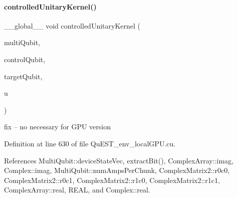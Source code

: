 \paragraph{\texorpdfstring{controlled\+Unitary\+Kernel()}{controlledUnitaryKernel()}}
{\footnotesize\ttfamily \+\_\+\+\_\+global\+\_\+\+\_\+ void controlled\+Unitary\+Kernel (\begin{DoxyParamCaption}\item[{\mbox{\hyperlink{structMultiQubit}{Multi\+Qubit}}}]{multi\+Qubit,  }\item[{const int}]{control\+Qubit,  }\item[{const int}]{target\+Qubit,  }\item[{\mbox{\hyperlink{structComplexMatrix2}{Complex\+Matrix2}}}]{u }\end{DoxyParamCaption})}

fix -- no necessary for G\+PU version 

Definition at line 630 of file Qu\+E\+S\+T\+\_\+env\+\_\+local\+G\+P\+U.\+cu.



References Multi\+Qubit\+::device\+State\+Vec, extract\+Bit(), Complex\+Array\+::imag, Complex\+::imag, Multi\+Qubit\+::num\+Amps\+Per\+Chunk, Complex\+Matrix2\+::r0c0, Complex\+Matrix2\+::r0c1, Complex\+Matrix2\+::r1c0, Complex\+Matrix2\+::r1c1, Complex\+Array\+::real, R\+E\+AL, and Complex\+::real.


